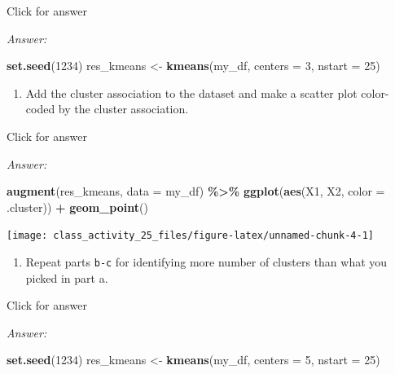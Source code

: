\documentclass[
]{book}
\newenvironment{Shaded}{\begin{snugshade}}{\end{snugshade}}
\newcommand{\AttributeTok}[1]{\textcolor[rgb]{0.13,0.29,0.53}{#1}}
\newcommand{\DecValTok}[1]{\textcolor[rgb]{0.00,0.00,0.81}{#1}}
\newcommand{\FunctionTok}[1]{\textcolor[rgb]{0.13,0.29,0.53}{\textbf{#1}}}
\newcommand{\NormalTok}[1]{#1}
\newcommand{\OtherTok}[1]{\textcolor[rgb]{0.56,0.35,0.01}{#1}}
\newcommand{\SpecialCharTok}[1]{\textcolor[rgb]{0.81,0.36,0.00}{\textbf{#1}}}
\providecommand{\tightlist}{%
  \setlength{\itemsep}{0pt}\setlength{\parskip}{0pt}}
\begin{document}
Click for answer

\emph{Answer:}

\begin{Shaded}
\begin{Highlighting}[]
\FunctionTok{set.seed}\NormalTok{(}\DecValTok{1234}\NormalTok{)}
\NormalTok{res\_kmeans }\OtherTok{\textless{}{-}} \FunctionTok{kmeans}\NormalTok{(my\_df, }\AttributeTok{centers =} \DecValTok{3}\NormalTok{, }\AttributeTok{nstart =} \DecValTok{25}\NormalTok{)}
\end{Highlighting}
\end{Shaded}

\begin{enumerate}
\def\labelenumi{\alph{enumi}.}
\setcounter{enumi}{2}
\tightlist
\item
  Add the cluster association to the dataset and make a scatter plot color-coded by the cluster association.
\end{enumerate}

Click for answer

\emph{Answer:}

\begin{Shaded}
\begin{Highlighting}[]
\FunctionTok{augment}\NormalTok{(res\_kmeans, }\AttributeTok{data =}\NormalTok{ my\_df) }\SpecialCharTok{\%\textgreater{}\%}
  \FunctionTok{ggplot}\NormalTok{(}\FunctionTok{aes}\NormalTok{(X1, X2, }\AttributeTok{color =}\NormalTok{ .cluster)) }\SpecialCharTok{+}
  \FunctionTok{geom\_point}\NormalTok{()}
\end{Highlighting}
\end{Shaded}

\texttt{[image: class\_activity\_25\_files/figure-latex/unnamed-chunk-4-1]}

\begin{enumerate}
\def\labelenumi{\alph{enumi}.}
\setcounter{enumi}{3}
\tightlist
\item
  Repeat parts \texttt{b-c} for identifying more number of clusters than what you picked in part a.
\end{enumerate}

Click for answer

\emph{Answer:}

\begin{Shaded}
\begin{Highlighting}[]
\FunctionTok{set.seed}\NormalTok{(}\DecValTok{1234}\NormalTok{)}
\NormalTok{res\_kmeans }\OtherTok{\textless{}{-}} \FunctionTok{kmeans}\NormalTok{(my\_df, }\AttributeTok{centers =} \DecValTok{5}\NormalTok{, }\AttributeTok{nstart =} \DecValTok{25}\NormalTok{)}
\end{Highlighting}
\end{Shaded}
\end{document}
